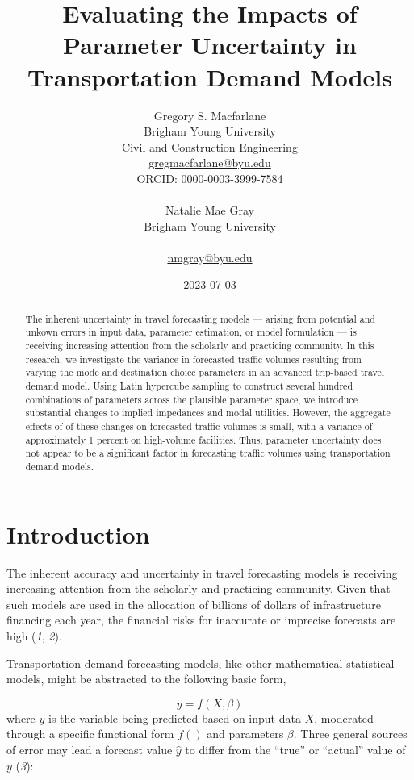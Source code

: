 \documentclass[
  letterpaper,
]{trb}
\title{Evaluating the Impacts of Parameter Uncertainty in Transportation
Demand Models}
\author{
Gregory S. Macfarlane\\Brigham Young University\\Civil and Construction
Engineering\\\href{mailto:gregmacfarlane@byu.edu}{gregmacfarlane@byu.edu}\\ORCID: 0000-0003-3999-7584\\ \\ 
Natalie Mae Gray\\Brigham Young
University\\\\\href{mailto:nmgray@byu.edu}{nmgray@byu.edu}\\}
\date{2023-07-03}
\begin{document}
\maketitle
\newpage
\begin{abstract}
The inherent uncertainty in travel forecasting models --- arising from
potential and unkown errors in input data, parameter estimation, or
model formulation --- is receiving increasing attention from the
scholarly and practicing community. In this research, we investigate the
variance in forecasted traffic volumes resulting from varying the mode
and destination choice parameters in an advanced trip-based travel
demand model. Using Latin hypercube sampling to construct several
hundred combinations of parameters across the plausible parameter space,
we introduce substantial changes to implied impedances and modal
utilities. However, the aggregate effects of of these changes on
forecasted traffic volumes is small, with a variance of approximately 1
percent on high-volume facilities. Thus, parameter uncertainty does not
appear to be a significant factor in forecasting traffic volumes using
transportation demand models.
\end{abstract}
\newpage
\ifdefined\Shaded\renewenvironment{Shaded}{\begin{tcolorbox}[boxrule=0pt, frame hidden, enhanced, interior hidden, borderline west={3pt}{0pt}{shadecolor}, breakable, sharp corners]}{\end{tcolorbox}}\fi


\hypertarget{introduction}{%
\section{Introduction}\label{introduction}}

The inherent accuracy and uncertainty in travel forecasting models is
receiving increasing attention from the scholarly and practicing
community. Given that such models are used in the allocation of billions
of dollars of infrastructure financing each year, the financial risks
for inaccurate or imprecise forecasts are high (\emph{1}, \emph{2}).

Transportation demand forecasting models, like other
mathematical-statistical models, might be abstracted to the following
basic form,

\[
y = f(X, \beta)
\]where \(y\) is the variable being predicted based on input data \(X\),
moderated through a specific functional form \(f()\) and parameters
\(\beta\). Three general sources of error may lead a forecast value
\(\hat{y}\) to differ from the ``true'' or ``actual'' value of \(y\)
(\emph{3}):
\end{document}
